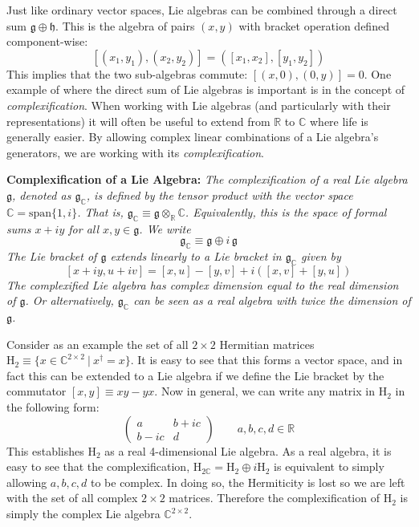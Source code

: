 \documentclass{article}
\renewcommand{\t}[1]{\text{#1}}
\newcommand{\definition}[2]{
	\begin{center}
		\begin{tcolorbox}[colframe=MidnightBlue, colback=black!5, arc=2mm, outer arc=0.5mm, width=\linewidth, left=2mm, right=2mm]
			\textbf{#1:} \emph{#2}	
		\end{tcolorbox}
	\end{center}\noindent}
\begin{document}
Just like ordinary vector spaces, Lie algebras can be combined through a direct sum $\mathfrak{g}\oplus\mathfrak{h}$. This is the algebra of pairs $(x,y)$ with bracket operation defined component-wise:
$$ [(x_1,y_1), (x_2, y_2)] = ([x_1,x_2],  [y_1, y_2]) $$
This implies that the two sub-algebras commute: $[(x,0), (0,y)]=0$. One example of where the direct sum of Lie algebras is important is in the concept of \emph{complexification}. When working with Lie algebras (and particularly with their representations) it will often be useful to extend from $\mathbb{R}$ to $\mathbb{C}$ where life is generally easier. By allowing complex linear combinations of a Lie algebra's generators, we are working with its \emph{complexification}. \definition{Complexification of a Lie Algebra}{The complexification of a real Lie algebra $\mathfrak{g}$, denoted as $\mathfrak{g}_\mathbb{C}$, is defined by the tensor product with the vector space $\mathbb{C}=\t{span}\{1, i\} $. That is,  $\mathfrak{g}_\mathbb{C}\equiv \mathfrak{g}\otimes_\mathbb{R}\mathbb{C}$. Equivalently, this is the space of formal sums $x+iy$ for all $x,y\in\mathfrak{g}$. We write
$$ \mathfrak{g}_\mathbb{C} \equiv \mathfrak{g} \oplus i\,\mathfrak{g} $$
The Lie bracket of $\mathfrak{g}$ extends linearly to a Lie bracket in $\mathfrak{g}_\mathbb{C}$ given by 
	$$ [x+iy, u+iv] = [x,u] - [y,v] + i([x,v] + [y,u]) $$ 
	The complexified Lie algebra has complex dimension equal to the real dimension of $\mathfrak{g}$. Or alternatively, $\mathfrak{g}_\mathbb{C}$ can be seen as a real algebra with twice the dimension of $\mathfrak{g}$.}
Consider as an example the set of all $2\times 2$ Hermitian matrices $\t{H}_2 \equiv \{x\in\mathbb{C}^{2\times 2} \:|\: x^\dagger = x\}$. It is easy to see that this forms a vector space, and in fact this can be extended to a Lie algebra if we define the Lie bracket by the commutator $[x,y]\equiv xy - yx$. Now in general, we can write any matrix in $\t{H}_2$ in the following form:
$$ \begin{pmatrix}
	a & b + ic \\
	b - ic & d
\end{pmatrix}\quad\quad a,b,c,d\in\mathbb{R}$$
This establishes $\t{H}_2$ as a real 4-dimensional Lie algebra. As a real algebra, it is easy to see that the complexification, $\t{H}_{2\mathbb{C}}=\t{H}_2\oplus i\t{H}_2$ is equivalent to simply allowing $a,b,c,d$ to be complex. In doing so, the Hermiticity is lost so we are left with the set of all complex $2\times 2$ matrices. Therefore the complexification of $\t{H}_2$  is simply the complex Lie algebra $\mathbb{C}^{2\times 2}$.
\end{document}
